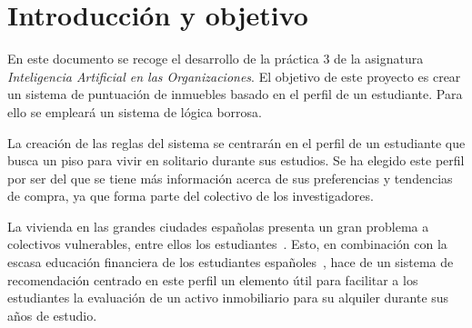 \documentclass[12pt]{report} %
\begin{document}
\newpage %
\thispagestyle{empty}
\mbox{}


\tableofcontents
\thispagestyle{fancy}

\newpage %
\thispagestyle{empty}
\mbox{}

 \listoffigures
 \thispagestyle{fancy}

 \newpage %
 \thispagestyle{empty}
 \mbox{}

\listoftables
 \thispagestyle{fancy}

 \newpage %
 \thispagestyle{empty}
 \mbox{}


\clearpage
{} %

    \chapter{Introducción y objetivo}
    \label{chap:intro}

        En este documento se recoge el desarrollo de la práctica 3 de la
        asignatura \textit{Inteligencia Artificial en las Organizaciones}. El
        objetivo de este proyecto es crear un sistema de puntuación de inmuebles 
        basado en el perfil de un estudiante. Para ello se empleará un sistema
        de lógica borrosa.

        La creación de las reglas del sistema se centrarán en el perfil de un
        estudiante que busca un piso para vivir en solitario durante sus
        estudios. Se ha elegido este perfil por ser del que se tiene más
        información acerca de sus preferencias y tendencias de compra, ya que
        forma parte del colectivo de los investigadores.

        La vivienda en las grandes ciudades españolas presenta un gran problema
        a colectivos vulnerables, entre ellos los
        estudiantes~\cite{viviendas-precio-inaccesible}. Esto, en combinación
        con la escasa educación financiera de los estudiantes
        españoles~\cite{PISA-2022}, hace de un sistema de recomendación
        centrado en este perfil un elemento útil para facilitar a los
        estudiantes la evaluación de un activo inmobiliario para su alquiler
        durante sus años de estudio.
\end{document}
